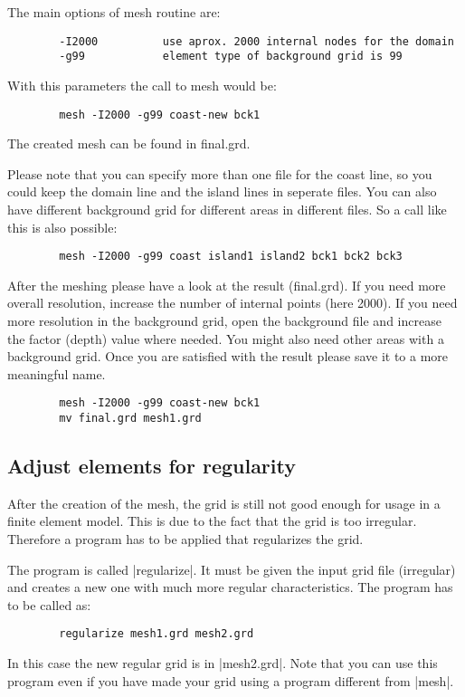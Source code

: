The main options of mesh routine are:

\begin{verbatim}
        -I2000          use aprox. 2000 internal nodes for the domain
        -g99            element type of background grid is 99
\end{verbatim}

With this parameters the call to mesh would be:

\begin{verbatim}
        mesh -I2000 -g99 coast-new bck1
\end{verbatim}

The created mesh can be found in final.grd.

Please note that you can specify more than one file for the coast line,
so you could keep the domain line and the island lines in seperate files.
You can also have different background grid for different areas in
different files. So a call like this is also possible:

\begin{verbatim}
        mesh -I2000 -g99 coast island1 island2 bck1 bck2 bck3
\end{verbatim}

After the meshing please have a look at the result (final.grd).
If you need more overall resolution, increase the number of internal
points (here 2000). If you need more resolution in the background grid,
open the background file and increase the factor (depth) value where needed.
You might also need other areas with a background grid. Once you
are satisfied with the result please save it to a more meaningful name.

\begin{verbatim}
        mesh -I2000 -g99 coast-new bck1
        mv final.grd mesh1.grd
\end{verbatim}

\subsection{Adjust elements for regularity}

After the creation of the mesh, the grid is still not good enough
for usage in a finite element model. This is due to the fact that
the grid is too irregular. Therefore a program has to be applied
that regularizes the grid.

The program is called |regularize|. It must be given the input grid file
(irregular) and creates a new one with much more regular characteristics.
The program has to be called as:

\begin{verbatim}
        regularize mesh1.grd mesh2.grd
\end{verbatim}

In this case the new regular grid is in |mesh2.grd|. Note that you
can use this program even if you have made your grid using a program
different from |mesh|.

